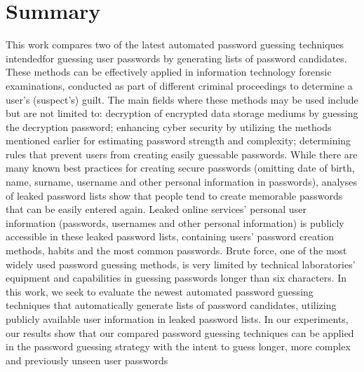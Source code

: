 \documentclass{VUMIFInfBakalaurinis}
\begin{document}
\section{Summary}
This work compares two of the latest automated password guessing techniques 
intendedfor guessing user passwords by generating lists of password candidates. 
These methods can be effectively applied in information technology forensic 
examinations, conducted as part of different criminal proceedings to determine a 
user's (suspect's) guilt. The main fields where these methods may be used 
include but are not limited to: decryption of encrypted data storage mediums by 
guessing the decryption password; enhancing cyber security by utilizing the 
methods mentioned earlier for estimating password strength and complexity; 
determining rules that prevent users from creating easily guessable passwords. 
While there are many known best practices for creating secure passwords 
(omitting date of birth, name, surname, username and other personal information 
in passwords), analyses of leaked password lists show that people tend to create 
memorable passwords that can be easily entered again. Leaked online services' 
personal user information (passwords, usernames and other personal information) 
is publicly accessible in these leaked password lists, containing users' 
password creation methods, habits and the most common passwords. Brute force, 
one of the most widely used password guessing methods, is very limited by 
technical laboratories' equipment and capabilities in guessing passwords longer 
than six characters. In this work, we seek to evaluate the newest automated 
password guessing techniques that automatically generate lists of password 
candidates, utilizing publicly available user information in leaked password 
lists. In our experiments, our results show that our compared password guessing 
techniques can be applied in the password guessing strategy with the intent to 
guess longer, more complex and previously unseen user passwords
\end{document}

